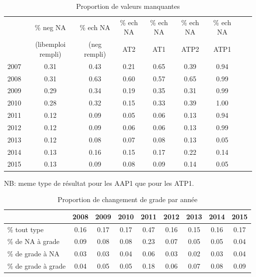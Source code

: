\documentclass[11pt,a4paper]{article}
\begin{document}
\begin{table}[h!]
\centering
\caption{Proportion de valeurs manquantes} 
\label{filters}
\begin{tabular}{lcccccccc}
\toprule
& \% neg NA  & \% ech NA & \% ech NA   & \% ech NA   & \% ech NA  & \% ech NA  \\ 
& (libemploi rempli) & (neg rempli) & AT2 & AT1 & ATP2 & ATP1 \\
  \midrule 
2007 & 0.31 & 0.43 & 0.21 & 0.65 & 0.39 & 0.94 \\ 
  2008 & 0.31 & 0.63 & 0.60 & 0.57 & 0.65 & 0.99 \\ 
  2009 & 0.29 & 0.34 & 0.19 & 0.35 & 0.31 & 0.99 \\ 
  2010 & 0.28 & 0.32 & 0.15 & 0.33 & 0.39 & 1.00 \\ 
  2011 & 0.12 & 0.09 & 0.05 & 0.06 & 0.13 & 0.94 \\ 
  2012 & 0.12 & 0.09 & 0.06 & 0.06 & 0.13 & 0.99 \\ 
  2013 & 0.12 & 0.08 & 0.07 & 0.08 & 0.13 & 0.05 \\ 
  2014 & 0.13 & 0.16 & 0.15 & 0.17 & 0.22 & 0.14 \\ 
  2015 & 0.13 & 0.09 & 0.08 & 0.09 & 0.14 & 0.05 \\ 
\bottomrule
\end{tabular}
\end{table}

NB: meme type de résultat pour les AAP1 que pour les ATP1.

\begin{table}[h!]
\centering
\caption{Proportion de changement de grade par année} 
\label{filters}
\begin{tabular}{lcccccccc}
\toprule
 & 2008 & 2009 & 2010 & 2011 & 2012 & 2013 & 2014 & 2015 \\ 
  \hline
\% tout type & 0.16 & 0.17 & 0.17 & 0.47 & 0.16 & 0.15 & 0.16 & 0.17 \\ 
\midrule
  \% de NA à grade & 0.09 & 0.08 & 0.08 & 0.23 & 0.07 & 0.05 & 0.05 & 0.04 \\ 
  \% de grade à NA & 0.03 & 0.03 & 0.04 & 0.06 & 0.03 & 0.02 & 0.03 & 0.04 \\ 
  \% de grade à grade & 0.04 & 0.05 & 0.05 & 0.18 & 0.06 & 0.07 & 0.08 & 0.09 \\ 
\bottomrule
\end{tabular}
\end{table}
\end{document}
